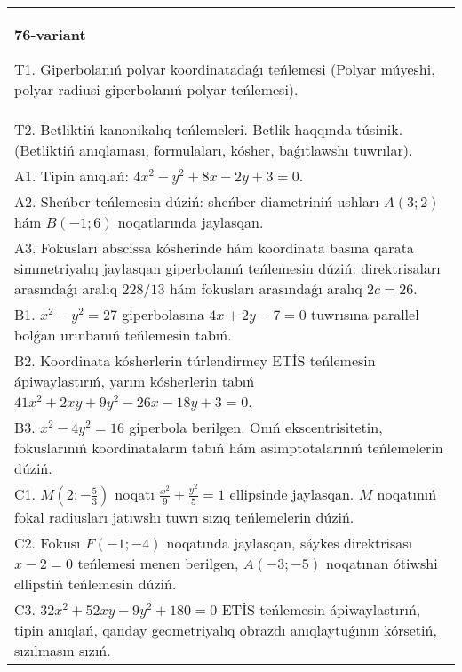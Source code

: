 \documentclass{article}
\begin{document}
\begin{tabular}{m{17cm}}
\textbf{76-variant}
\newline

T1. Giperbolanıń polyar koordinatadaǵı teńlemesi (Polyar múyeshi, polyar radiusi giperbolanıń polyar teńlemesi).\\

T2. Betliktiń kanonikalıq teńlemeleri. Betlik haqqında túsinik. (Betliktiń anıqlaması, formulaları, kósher, baǵıtlawshı tuwrılar).\\

A1. Tipin anıqlań: $4 x^{2}-y^{2}+8 x-2 y+3=0$.\\

A2. Sheńber teńlemesin dúziń: sheńber diametriniń ushları $A (3;2) $ hám $B (-1;6 ) $ noqatlarında jaylasqan.\\

A3. Fokusları abscissa kósherinde hám koordinata basına qarata simmetriyalıq jaylasqan giperbolanıń teńlemesin dúziń: direktrisaları arasındaǵı aralıq $228/13$ hám fokusları arasındaǵı aralıq $2 c=26$.\\

B1. $x^{2} - y^{2} = 27$ giperbolasına $4x + 2y - 7 = 0$ tuwrısına parallel bolǵan urınbanıń teńlemesin tabıń.  \\

B2. Koordinata kósherlerin túrlendirmey ETİS teńlemesin ápiwaylastırıń, yarım kósherlerin tabıń $41x^{2} + 2xy + 9y^{2} - 26x - 18y + 3 = 0$.  \\

B3. $x^{2} - 4y^{2} = 16$ giperbola berilgen. Onıń ekscentrisitetin, fokuslarınıń koordinataların tabıń hám asimptotalarınıń teńlemelerin dúziń.\\

C1. $M(2; - \frac{5}{3})$ noqatı $\frac{x^{2}}{9} + \frac{y^{2}}{5} = 1$ ellipsinde jaylasqan. $M$ noqatınıń fokal radiusları jatıwshı tuwrı sızıq teńlemelerin dúziń.  \\

C2. Fokusı $F( - 1; - 4)$ noqatında jaylasqan, sáykes direktrisası $x - 2 = 0$ teńlemesi menen berilgen, $A( - 3; - 5)$ noqatınan ótiwshi ellipstiń teńlemesin dúziń.  \\

C3. $32x^{2} + 52xy - 9y^{2} + 180 = 0$ ETİS teńlemesin ápiwaylastırıń, tipin anıqlań, qanday geometriyalıq obrazdı anıqlaytuǵının kórsetiń, sızılmasın sızıń.  \\

\end{tabular}
\vspace{1cm}
\end{document}
